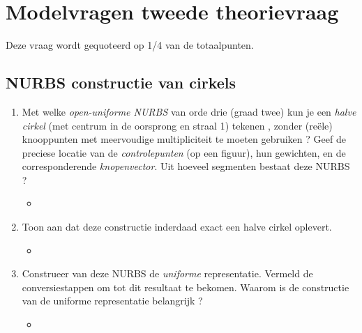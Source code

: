\documentclass{report}
\newcommand{\vraag}[2]{
	\item #1
	
	#2
}
\begin{document}
	\chapter{Modelvragen tweede theorievraag}
	Deze vraag wordt gequoteerd op 1/4 van de totaalpunten.
	
	\section{NURBS constructie van cirkels }
	\begin{enumerate}
		\vraag{Met welke \textit{open-uniforme NURBS} van orde drie (graad twee) kun je een \textit{halve cirkel} (met centrum in de oorsprong en straal 1) tekenen , zonder (reële) knooppunten met meervoudige multipliciteit te moeten gebruiken ? Geef de preciese locatie van de \textit{controlepunten} (op een figuur), hun gewichten, en de corresponderende \textit{knopenvector}. Uit hoeveel segmenten bestaat deze NURBS ?}{\begin{itemize} \item {} \end{itemize}}
		
		\vraag{Toon aan dat deze constructie inderdaad exact een halve cirkel oplevert.}{\begin{itemize} \item {} \end{itemize}}
		
		\vraag{Construeer van deze NURBS de \textit{uniforme} representatie. Vermeld de conversiestappen om tot dit resultaat te bekomen. Waarom is de constructie van de uniforme representatie belangrijk ?}{\begin{itemize} \item \todo{oplossen} \end{itemize}}
	\end{enumerate}
\end{document}
